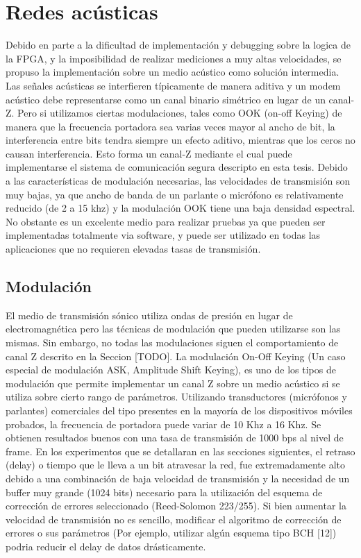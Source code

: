 \section{Redes acústicas}
Debido en parte a la dificultad de implementación y debugging sobre la logica de la FPGA, y la imposibilidad de realizar mediciones a muy altas velocidades, se propuso la implementación sobre un medio acústico como solución intermedia. Las señales acústicas se interfieren típicamente de manera aditiva y un modem acústico debe representarse como un canal binario simétrico en lugar de un canal-Z. Pero si utilizamos ciertas modulaciones, tales como OOK (on-off Keying) de manera que la frecuencia portadora sea varias veces mayor al ancho de bit, la interferencia entre bits tendra siempre un efecto aditivo, mientras que los ceros no causan interferencia. Esto forma un canal-Z mediante el cual puede implementarse el sistema de comunicación segura descripto en esta tesis. Debido a las características de modulación necesarias, las velocidades de transmisión son muy bajas, ya que ancho de banda de un parlante o micrófono es relativamente reducido (de 2 a 15 khz) y la modulación OOK tiene una baja densidad espectral. 
No obstante es un excelente medio para realizar pruebas ya que pueden ser implementadas totalmente via software, y puede ser utilizado en todas las aplicaciones que no requieren elevadas tasas de transmisión.

\subsection{Modulación}
El medio de transmisión sónico utiliza ondas de presión en lugar de electromagnética pero las técnicas de modulación que pueden utilizarse son las mismas.
Sin embargo, no todas las modulaciones siguen el comportamiento de canal Z descrito en la Seccion [TODO].
La modulación On-Off Keying (Un caso especial de modulación ASK, Amplitude Shift Keying), es uno de los tipos de modulación que permite implementar un canal Z sobre un medio acústico si se utiliza sobre cierto rango de parámetros. Utilizando transductores (micrófonos y parlantes) comerciales del tipo presentes en la mayoría de los dispositivos móviles probados, la frecuencia de portadora puede variar de 10 Khz a 16 Khz. Se obtienen resultados buenos con una tasa de transmisión de 1000 bps al nivel de frame. En los experimentos que se detallaran en las secciones siguientes, el retraso (delay) o tiempo que le lleva a un bit atravesar la red, fue extremadamente alto debido a una combinación de baja velocidad de transmisión y la necesidad de un buffer muy grande (1024 bits) necesario para la utilización del esquema de corrección de errores seleccionado (Reed-Solomon 223/255). Si bien aumentar la velocidad de transmisión no es sencillo, modificar el algoritmo de corrección de errores o sus parámetros (Por ejemplo, utilizar algún esquema tipo BCH [12]) podria reducir el delay de datos drásticamente.


